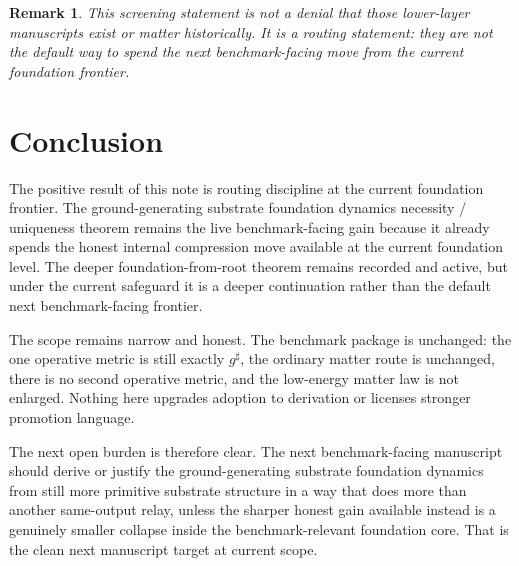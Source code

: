 \documentclass[11pt]{article}
\newcommand{\CompletedMetric}{g^{\sharp}}
\newtheorem{remark}{Remark}
\begin{document}
\begin{remark}
This screening statement is not a denial that those lower-layer manuscripts exist or matter historically. It is a routing statement: they are not the default way to spend the next benchmark-facing move from the current foundation frontier.
\end{remark}

\section{Conclusion}

The positive result of this note is routing discipline at the current foundation frontier. The ground-generating substrate foundation dynamics necessity / uniqueness theorem remains the live benchmark-facing gain because it already spends the honest internal compression move available at the current foundation level. The deeper foundation-from-root theorem remains recorded and active, but under the current safeguard it is a deeper continuation rather than the default next benchmark-facing frontier.

The scope remains narrow and honest. The benchmark package is unchanged: the one operative metric is still exactly \(\CompletedMetric\), the ordinary matter route is unchanged, there is no second operative metric, and the low-energy matter law is not enlarged. Nothing here upgrades adoption to derivation or licenses stronger promotion language.

The next open burden is therefore clear. The next benchmark-facing manuscript should derive or justify the ground-generating substrate foundation dynamics from still more primitive substrate structure in a way that does more than another same-output relay, unless the sharper honest gain available instead is a genuinely smaller collapse inside the benchmark-relevant foundation core. That is the clean next manuscript target at current scope.
\end{document}
